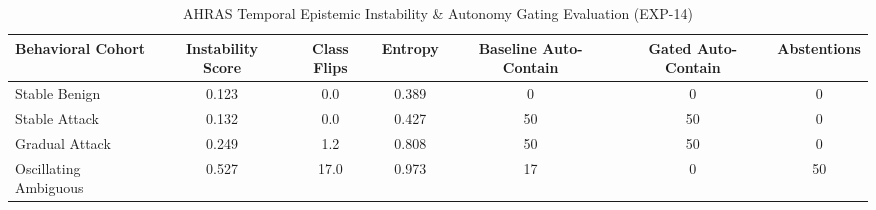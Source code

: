 \begin{table}[t]
\centering
\small
\caption{AHRAS Temporal Epistemic Instability & Autonomy Gating Evaluation (EXP-14)}
\label{tab:temporal_instability_eval}
\begin{tabular}{lcccccc}
\toprule
\textbf{Behavioral Cohort} & \textbf{Instability Score} & \textbf{Class Flips} & \textbf{Entropy} & \textbf{Baseline Auto-Contain} & \textbf{Gated Auto-Contain} & \textbf{Abstentions} \\
\midrule
Stable Benign & 0.123 & 0.0 & 0.389 & 0 & 0 & 0 \\
Stable Attack & 0.132 & 0.0 & 0.427 & 50 & 50 & 0 \\
Gradual Attack & 0.249 & 1.2 & 0.808 & 50 & 50 & 0 \\
Oscillating Ambiguous & 0.527 & 17.0 & 0.973 & 17 & 0 & 50 \\
\bottomrule
\end{tabular}
\end{table}
